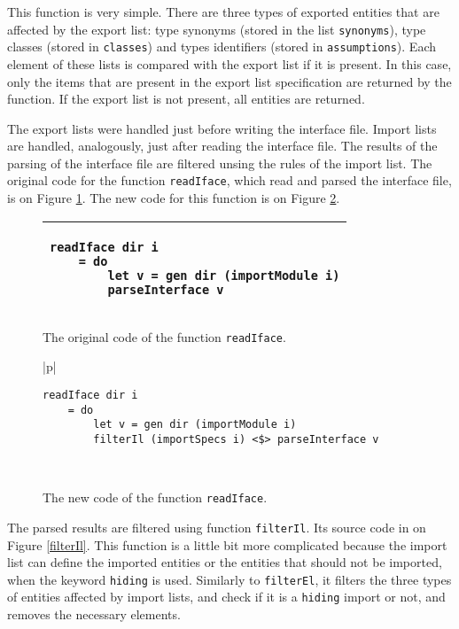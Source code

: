 \documentclass[msc]{ppgccufmg}
\begin{document}
This function is very simple.
There are three types of exported entities that are affected by the export list: type synonyms (stored in the list \texttt{synonyms}), type classes (stored in \texttt{classes}) and types identifiers (stored in \texttt{assumptions}).
Each element of these lists is compared with the export list if it is present.
In this case, only the items that are present in the export list specification are returned by the function.
If the export list is not present, all entities are returned.

The export lists were handled just before writing the interface file.
Import lists are handled, analogously, just after reading the interface file.
The results of the parsing of the interface file are filtered unsing the rules of the import list.
The original code for the function \texttt{readIface}, which read and parsed the interface file, is on Figure \ref{il-orig}.
The new code for this function is on Figure \ref{il-new}.

\begin{figure}
\caption{The original code of the function \texttt{readIface}.\label{il-orig}}
\begin{tabular}{|p{\textwidth}|}
\hline
\begin{verbatim}
readIface dir i 
    = do
        let v = gen dir (importModule i)
        parseInterface v    
\end{verbatim}
\\
\hline
\end{tabular}
\end{figure}

\begin{figure}
\caption{The new code of the function \texttt{readIface}.\label{il-new}}
\begin{tabular}{|p{\textwidth}|}
\hline
\begin{verbatim}
readIface dir i 
    = do
        let v = gen dir (importModule i)
        filterIl (importSpecs i) <$> parseInterface v    
\end{verbatim}
\\
\hline
\end{tabular}
\end{figure}

The parsed results are filtered using function \texttt{filterIl}.
Its source code in on Figure \ref{filterIl}.
This function is a little bit more complicated because the import list can define the imported entities or the entities that should not be imported, when the keyword \texttt{hiding} is used.
Similarly to \texttt{filterEl}, it filters the three types of entities affected by import lists, and check if it is a \texttt{hiding} import or not, and removes the necessary elements.
\end{document}
